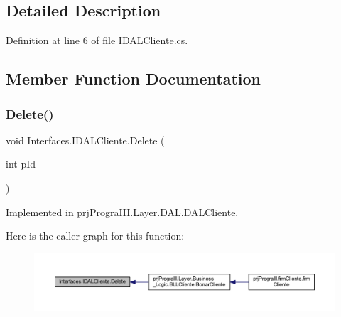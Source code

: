 \subsection{Detailed Description}


Definition at line 6 of file I\+D\+A\+L\+Cliente.\+cs.



\subsection{Member Function Documentation}
\hypertarget{interface_interfaces_1_1_i_d_a_l_cliente_a1d5922d64bfd29e76bc6f26c60230c15}{}\label{interface_interfaces_1_1_i_d_a_l_cliente_a1d5922d64bfd29e76bc6f26c60230c15} 
\subsubsection{\texorpdfstring{Delete()}{Delete()}}
{\footnotesize\ttfamily void Interfaces.\+I\+D\+A\+L\+Cliente.\+Delete (\begin{DoxyParamCaption}\item[{int}]{p\+Id }\end{DoxyParamCaption})}



Implemented in \hyperlink{classprj_progra_i_i_i_1_1_layer_1_1_d_a_l_1_1_d_a_l_cliente_aa864635af5a546442d825e34483cf736}{prj\+Progra\+I\+I\+I.\+Layer.\+D\+A\+L.\+D\+A\+L\+Cliente}.

Here is the caller graph for this function\+:
\nopagebreak
\begin{figure}[H]
\begin{center}
\leavevmode
\includegraphics[width=350pt]{interface_interfaces_1_1_i_d_a_l_cliente_a1d5922d64bfd29e76bc6f26c60230c15_icgraph}
\end{center}
\end{figure}
\hypertarget{interface_interfaces_1_1_i_d_a_l_cliente_a73ffe691596e644e3b87f7685dc19e42}{}\label{interface_interfaces_1_1_i_d_a_l_cliente_a73ffe691596e644e3b87f7685dc19e42} 
